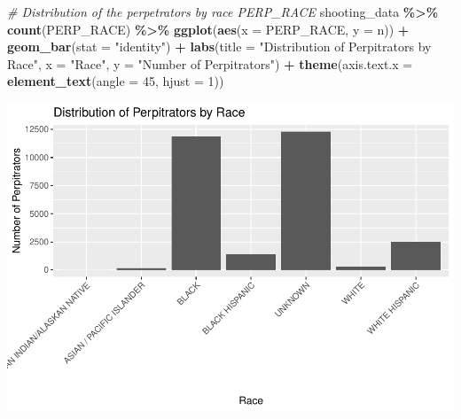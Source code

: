 \documentclass[
]{article}
\newenvironment{Shaded}{\begin{snugshade}}{\end{snugshade}}
\newcommand{\AttributeTok}[1]{\textcolor[rgb]{0.13,0.29,0.53}{#1}}
\newcommand{\CommentTok}[1]{\textcolor[rgb]{0.56,0.35,0.01}{\textit{#1}}}
\newcommand{\DecValTok}[1]{\textcolor[rgb]{0.00,0.00,0.81}{#1}}
\newcommand{\FunctionTok}[1]{\textcolor[rgb]{0.13,0.29,0.53}{\textbf{#1}}}
\newcommand{\NormalTok}[1]{#1}
\newcommand{\SpecialCharTok}[1]{\textcolor[rgb]{0.81,0.36,0.00}{\textbf{#1}}}
\newcommand{\StringTok}[1]{\textcolor[rgb]{0.31,0.60,0.02}{#1}}
\begin{document}
\begin{Shaded}
\begin{Highlighting}[]
\CommentTok{\# Distribution of the perpetrators by race PERP\_RACE }
\NormalTok{shooting\_data }\SpecialCharTok{\%\textgreater{}\%}
  \FunctionTok{count}\NormalTok{(PERP\_RACE) }\SpecialCharTok{\%\textgreater{}\%}
  \FunctionTok{ggplot}\NormalTok{(}\FunctionTok{aes}\NormalTok{(}\AttributeTok{x =}\NormalTok{ PERP\_RACE, }\AttributeTok{y =}\NormalTok{ n)) }\SpecialCharTok{+}
  \FunctionTok{geom\_bar}\NormalTok{(}\AttributeTok{stat =} \StringTok{"identity"}\NormalTok{) }\SpecialCharTok{+}
  \FunctionTok{labs}\NormalTok{(}\AttributeTok{title =} \StringTok{"Distribution of Perpitrators by Race"}\NormalTok{,}
       \AttributeTok{x =} \StringTok{"Race"}\NormalTok{,}
       \AttributeTok{y =} \StringTok{"Number of Perpitrators"}\NormalTok{)  }\SpecialCharTok{+}
  \FunctionTok{theme}\NormalTok{(}\AttributeTok{axis.text.x =} \FunctionTok{element\_text}\NormalTok{(}\AttributeTok{angle =} \DecValTok{45}\NormalTok{, }\AttributeTok{hjust =} \DecValTok{1}\NormalTok{))}
\end{Highlighting}
\end{Shaded}

\includegraphics{nypd-shooting-data-analysis_files/figure-latex/distributions-3.pdf}
\end{document}
